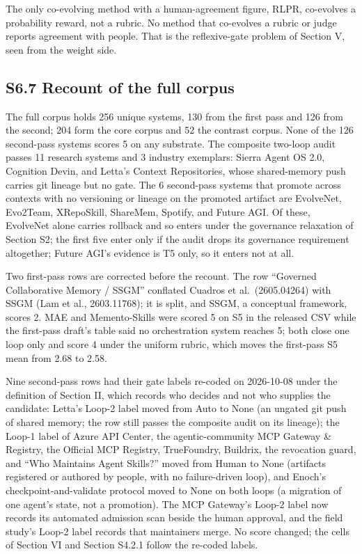 \documentclass[
]{article}
\begin{document}
The only co-evolving method with a human-agreement figure, RLPR,
co-evolves a probability reward, not a rubric. No method that co-evolves
a rubric or judge reports agreement with people. That is the
reflexive-gate problem of Section V, seen from the weight side.

\subsection{S6.7 Recount of the full
corpus}\label{s6.7-recount-of-the-full-corpus}

The full corpus holds 256 unique systems, 130 from the first pass and
126 from the second; 204 form the core corpus and 52 the contrast
corpus. None of the 126 second-pass systems scores 5 on any substrate.
The composite two-loop audit passes 11 research systems and 3 industry
exemplars: Sierra Agent OS 2.0, Cognition Devin, and Letta's Context
Repositories, whose shared-memory push carries git lineage but no gate.
The 6 second-pass systems that promote across contexts with no
versioning or lineage on the promoted artifact are EvolveNet, Evo2Team,
XRepoSkill, ShareMem, Spotify, and Future AGI. Of these, EvolveNet alone
carries rollback and so enters under the governance relaxation of
Section S2; the first five enter only if the audit drops its governance
requirement altogether; Future AGI's evidence is T5 only, so it enters
not at all.

Two first-pass rows are corrected before the recount. The row ``Governed
Collaborative Memory / SSGM'' conflated Cuadros et al.~(2605.04264) with
SSGM (Lam et al., 2603.11768); it is split, and SSGM, a conceptual
framework, scores 2. MAE and Memento-Skills were scored 5 on S5 in the
released CSV while the first-pass draft's table said no orchestration
system reaches 5; both close one loop only and score 4 under the uniform
rubric, which moves the first-pass S5 mean from 2.68 to 2.58.

Nine second-pass rows had their gate labels re-coded on 2026-10-08 under
the definition of Section II, which records who decides and not who
supplies the candidate: Letta's Loop-2 label moved from Auto to None (an
ungated git push of shared memory; the row still passes the composite
audit on its lineage); the Loop-1 label of Azure API Center, the
agentic-community MCP Gateway \& Registry, the Official MCP Registry,
TrueFoundry, Buildrix, the revocation guard, and ``Who Maintains Agent
Skills?'' moved from Human to None (artifacts registered or authored by
people, with no failure-driven loop), and Enoch's
checkpoint-and-validate protocol moved to None on both loops (a
migration of one agent's state, not a promotion). The MCP Gateway's
Loop-2 label now records its automated admission scan beside the human
approval, and the field study's Loop-2 label records that maintainers
merge. No score changed; the cells of Section VI and Section S4.2.1
follow the re-coded labels.
\end{document}
